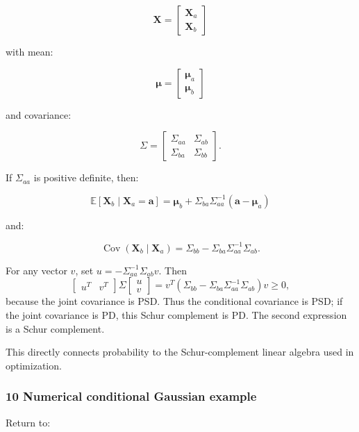 \[
 \mathbf X= \begin{bmatrix} \mathbf X_a\\ \mathbf X_b \end{bmatrix}
\]

with mean:

\[
 \boldsymbol\mu= \begin{bmatrix} \boldsymbol\mu_a\\ \boldsymbol\mu_b \end{bmatrix}
\]

and covariance:

\[
 \Sigma= \begin{bmatrix} \Sigma_{aa}&\Sigma_{ab}\\ \Sigma_{ba}&\Sigma_{bb} \end{bmatrix}.
\]

If \(\Sigma_{aa}\) is positive definite, then:

\[
 \boxed{ \mathbb E[\mathbf X_b\mid\mathbf X_a=\mathbf a] = \boldsymbol\mu_b+ \Sigma_{ba}\Sigma_{aa}^{-1} (\mathbf a-\boldsymbol\mu_a) }
\]

and:

\[
 \boxed{ \operatorname{Cov}(\mathbf X_b\mid\mathbf X_a) = \Sigma_{bb} - \Sigma_{ba}\Sigma_{aa}^{-1}\Sigma_{ab} }.
\]

For any vector \(v\), set \(u=-\Sigma_{aa}^{-1}\Sigma_{ab}v\). Then \[
\begin{bmatrix}u^T&v^T\end{bmatrix}
\Sigma
\begin{bmatrix}u\\v\end{bmatrix}
=
v^T\left(\Sigma_{bb}-\Sigma_{ba}\Sigma_{aa}^{-1}\Sigma_{ab}\right)v
\ge 0,
\] because the joint covariance is PSD. Thus the conditional covariance is PSD; if the joint covariance is PD, this Schur complement is PD. The second expression is a Schur complement.

This directly connects probability to the Schur-complement linear algebra used in optimization.

\subsubsection{10 Numerical conditional Gaussian example}\label{02-foundations-ii-ch024-numerical-conditional-gaussian-example}

\hypertarget{02-foundations-ii-ch024-numerical-conditional-gaussian-example}{}

Return to:

